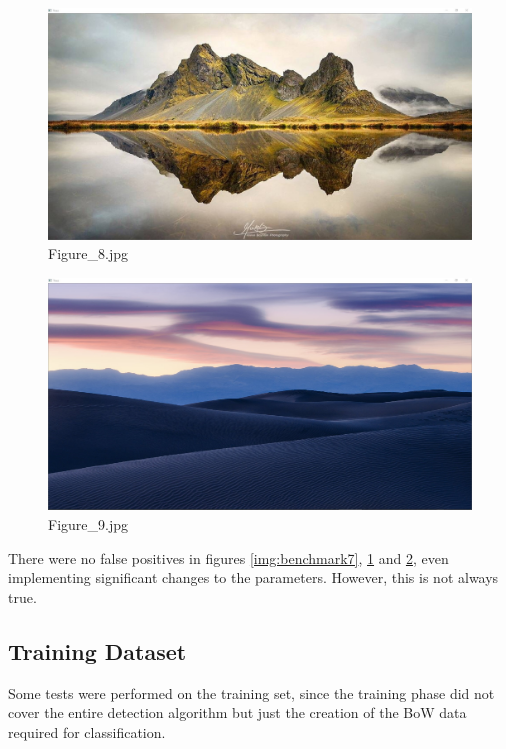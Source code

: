 \documentclass{article}
\begin{document}
\begin{figure}[h]
\begin{center}
\includegraphics[width=1\textwidth]{images/b8}
\caption{\footnotesize{Figure\_8.jpg}}
\label{img:benchmark8}
\end{center}
\end{figure}

\begin{figure}[h]
\begin{center}
\includegraphics[width=1\textwidth]{images/b9}
\caption{\footnotesize{Figure\_9.jpg}}
\label{img:benchmark9}
\end{center}
\end{figure}

There were no false positives in figures \ref{img:benchmark7}, \ref{img:benchmark8} and \ref{img:benchmark9}, even implementing significant changes to the parameters. However, this is not always true.

\subsection{Training Dataset}
Some tests were performed on the training set, since the training phase did not cover the entire detection algorithm but just the creation of the BoW data required for classification. 
\end{document}
